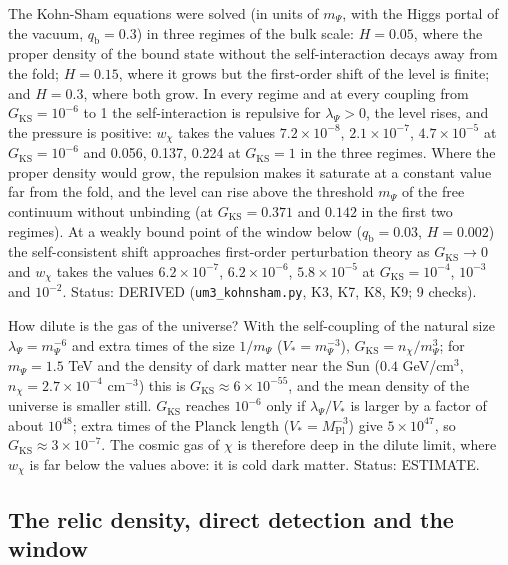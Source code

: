 \documentclass[
  10pt,
]{article}
\begin{document}
The Kohn-Sham equations were solved (in units of \(m_\Psi\), with the
Higgs portal of the vacuum, \(q_{\mathrm{b}} = 0.3\)) in three regimes
of the bulk scale: \(H = 0.05\), where the proper density of the bound
state without the self-interaction decays away from the fold;
\(H = 0.15\), where it grows but the first-order shift of the level is
finite; and \(H = 0.3\), where both grow. In every regime and at every
coupling from \(G_{\mathrm{KS}} = 10^{-6}\) to 1 the self-interaction is
repulsive for \(\lambda_\Psi > 0\), the level rises, and the pressure is
positive: \(w_\chi\) takes the values \(7.2\times10^{-8}\),
\(2.1\times10^{-7}\), \(4.7\times10^{-5}\) at
\(G_{\mathrm{KS}} = 10^{-6}\) and 0.056, 0.137, 0.224 at
\(G_{\mathrm{KS}} = 1\) in the three regimes. Where the proper density
would grow, the repulsion makes it saturate at a constant value far from
the fold, and the level can rise above the threshold \(m_\Psi\) of the
free continuum without unbinding (at \(G_{\mathrm{KS}} = 0.371\) and
\(0.142\) in the first two regimes). At a weakly bound point of the
window below (\(q_{\mathrm{b}} = 0.03\), \(H = 0.002\)) the
self-consistent shift approaches first-order perturbation theory as
\(G_{\mathrm{KS}} \to 0\) and \(w_\chi\) takes the values
\(6.2\times10^{-7}\), \(6.2\times10^{-6}\), \(5.8\times10^{-5}\) at
\(G_{\mathrm{KS}} = 10^{-4}\), \(10^{-3}\) and \(10^{-2}\). Status:
DERIVED (\texttt{um3\_kohnsham.py}, K3, K7, K8, K9; 9 checks).

How dilute is the gas of the universe? With the self-coupling of the
natural size \(\lambda_\Psi = m_\Psi^{-6}\) and extra times of the size
\(1/m_\Psi\) (\(V_* = m_\Psi^{-3}\)),
\(G_{\mathrm{KS}} = n_\chi/m_\Psi^3\); for \(m_\Psi = 1.5\) TeV and the
density of dark matter near the Sun (\(0.4\) GeV/cm\(^3\),
\(n_\chi = 2.7\times10^{-4}\) cm\(^{-3}\)) this is
\(G_{\mathrm{KS}} \approx 6\times10^{-55}\), and the mean density of the
universe is smaller still. \(G_{\mathrm{KS}}\) reaches \(10^{-6}\) only
if \(\lambda_\Psi/V_*\) is larger by a factor of about \(10^{48}\);
extra times of the Planck length (\(V_* = M_{\mathrm{Pl}}^{-3}\)) give
\(5\times10^{47}\), so \(G_{\mathrm{KS}} \approx 3\times10^{-7}\). The
cosmic gas of \(\chi\) is therefore deep in the dilute limit, where
\(w_\chi\) is far below the values above: it is cold dark matter.
Status: ESTIMATE.

\hypertarget{the-relic-density-direct-detection-and-the-window}{%
\subsection{The relic density, direct detection and the
window}\label{the-relic-density-direct-detection-and-the-window}}
\end{document}
